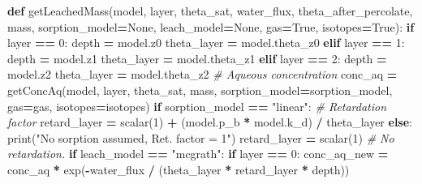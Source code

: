 \documentclass[]{article}
\newenvironment{Shaded}{\begin{snugshade}}{\end{snugshade}}
\newcommand{\KeywordTok}[1]{\textcolor[rgb]{0.13,0.29,0.53}{\textbf{#1}}}
\newcommand{\DecValTok}[1]{\textcolor[rgb]{0.00,0.00,0.81}{#1}}
\newcommand{\StringTok}[1]{\textcolor[rgb]{0.31,0.60,0.02}{#1}}
\newcommand{\CommentTok}[1]{\textcolor[rgb]{0.56,0.35,0.01}{\textit{#1}}}
\newcommand{\VariableTok}[1]{\textcolor[rgb]{0.00,0.00,0.00}{#1}}
\newcommand{\ControlFlowTok}[1]{\textcolor[rgb]{0.13,0.29,0.53}{\textbf{#1}}}
\newcommand{\OperatorTok}[1]{\textcolor[rgb]{0.81,0.36,0.00}{\textbf{#1}}}
\newcommand{\BuiltInTok}[1]{#1}
\newcommand{\NormalTok}[1]{#1}
\begin{document}
\begin{Shaded}
\begin{Highlighting}[]
\KeywordTok{def}\NormalTok{ getLeachedMass(model, layer, theta_sat,}
\NormalTok{                   water_flux,}
\NormalTok{                   theta_after_percolate,}
\NormalTok{                   mass,}
\NormalTok{                   sorption_model}\OperatorTok{=}\VariableTok{None}\NormalTok{,}
\NormalTok{                   leach_model}\OperatorTok{=}\VariableTok{None}\NormalTok{, gas}\OperatorTok{=}\VariableTok{True}\NormalTok{, isotopes}\OperatorTok{=}\VariableTok{True}\NormalTok{):}
    \ControlFlowTok{if}\NormalTok{ layer }\OperatorTok{==} \DecValTok{0}\NormalTok{:}
\NormalTok{        depth }\OperatorTok{=}\NormalTok{ model.z0}
\NormalTok{        theta_layer }\OperatorTok{=}\NormalTok{ model.theta_z0}
    \ControlFlowTok{elif}\NormalTok{ layer }\OperatorTok{==} \DecValTok{1}\NormalTok{:}
\NormalTok{        depth }\OperatorTok{=}\NormalTok{ model.z1}
\NormalTok{        theta_layer }\OperatorTok{=}\NormalTok{ model.theta_z1}
    \ControlFlowTok{elif}\NormalTok{ layer }\OperatorTok{==} \DecValTok{2}\NormalTok{:}
\NormalTok{        depth }\OperatorTok{=}\NormalTok{ model.z2}
\NormalTok{        theta_layer }\OperatorTok{=}\NormalTok{ model.theta_z2}
    \CommentTok{# Aqueous concentration}
\NormalTok{    conc_aq }\OperatorTok{=}\NormalTok{ getConcAq(model, layer, theta_sat, mass,}
\NormalTok{                        sorption_model}\OperatorTok{=}\NormalTok{sorption_model, gas}\OperatorTok{=}\NormalTok{gas, isotopes}\OperatorTok{=}\NormalTok{isotopes)}
    \ControlFlowTok{if}\NormalTok{ sorption_model }\OperatorTok{==} \StringTok{"linear"}\NormalTok{:}
        \CommentTok{# Retardation factor}
\NormalTok{        retard_layer }\OperatorTok{=}\NormalTok{ scalar(}\DecValTok{1}\NormalTok{) }\OperatorTok{+}\NormalTok{ (model.p_b }\OperatorTok{*}\NormalTok{ model.k_d) }\OperatorTok{/}\NormalTok{ theta_layer}
    \ControlFlowTok{else}\NormalTok{:}
        \BuiltInTok{print}\NormalTok{(}\StringTok{"No sorption assumed, Ret. factor = 1"}\NormalTok{)}
\NormalTok{        retard_layer }\OperatorTok{=}\NormalTok{ scalar(}\DecValTok{1}\NormalTok{)  }\CommentTok{# No retardation.}
    \ControlFlowTok{if}\NormalTok{ leach_model }\OperatorTok{==} \StringTok{"mcgrath"}\NormalTok{:}
        \ControlFlowTok{if}\NormalTok{ layer }\OperatorTok{==} \DecValTok{0}\NormalTok{:}
\NormalTok{            conc_aq_new }\OperatorTok{=}\NormalTok{ conc_aq }\OperatorTok{*}\NormalTok{ exp(}\OperatorTok{-}\NormalTok{water_flux }\OperatorTok{/}\NormalTok{ (theta_layer }\OperatorTok{*}\NormalTok{ retard_layer }\OperatorTok{*}\NormalTok{ depth))}

\end{Highlighting}
\end{Shaded}
\end{document}
